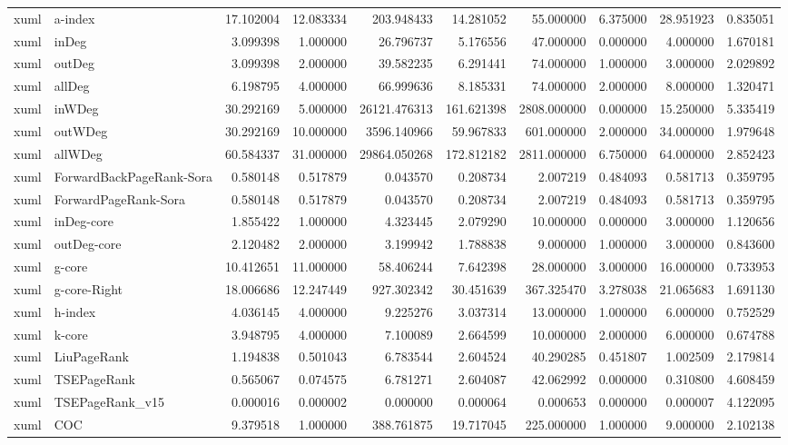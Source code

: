 \begin{tabular}{llrrrrrrrr}
xuml & a-index & 17.102004 & 12.083334 & 203.948433 & 14.281052 & 55.000000 & 6.375000 & 28.951923 & 0.835051 \\
xuml & inDeg & 3.099398 & 1.000000 & 26.796737 & 5.176556 & 47.000000 & 0.000000 & 4.000000 & 1.670181 \\
xuml & outDeg & 3.099398 & 2.000000 & 39.582235 & 6.291441 & 74.000000 & 1.000000 & 3.000000 & 2.029892 \\
xuml & allDeg & 6.198795 & 4.000000 & 66.999636 & 8.185331 & 74.000000 & 2.000000 & 8.000000 & 1.320471 \\
xuml & inWDeg & 30.292169 & 5.000000 & 26121.476313 & 161.621398 & 2808.000000 & 0.000000 & 15.250000 & 5.335419 \\
xuml & outWDeg & 30.292169 & 10.000000 & 3596.140966 & 59.967833 & 601.000000 & 2.000000 & 34.000000 & 1.979648 \\
xuml & allWDeg & 60.584337 & 31.000000 & 29864.050268 & 172.812182 & 2811.000000 & 6.750000 & 64.000000 & 2.852423 \\
xuml & ForwardBackPageRank-Sora & 0.580148 & 0.517879 & 0.043570 & 0.208734 & 2.007219 & 0.484093 & 0.581713 & 0.359795 \\
xuml & ForwardPageRank-Sora & 0.580148 & 0.517879 & 0.043570 & 0.208734 & 2.007219 & 0.484093 & 0.581713 & 0.359795 \\
xuml & inDeg-core & 1.855422 & 1.000000 & 4.323445 & 2.079290 & 10.000000 & 0.000000 & 3.000000 & 1.120656 \\
xuml & outDeg-core & 2.120482 & 2.000000 & 3.199942 & 1.788838 & 9.000000 & 1.000000 & 3.000000 & 0.843600 \\
xuml & g-core & 10.412651 & 11.000000 & 58.406244 & 7.642398 & 28.000000 & 3.000000 & 16.000000 & 0.733953 \\
xuml & g-core-Right & 18.006686 & 12.247449 & 927.302342 & 30.451639 & 367.325470 & 3.278038 & 21.065683 & 1.691130 \\
xuml & h-index & 4.036145 & 4.000000 & 9.225276 & 3.037314 & 13.000000 & 1.000000 & 6.000000 & 0.752529 \\
xuml & k-core & 3.948795 & 4.000000 & 7.100089 & 2.664599 & 10.000000 & 2.000000 & 6.000000 & 0.674788 \\
xuml & LiuPageRank & 1.194838 & 0.501043 & 6.783544 & 2.604524 & 40.290285 & 0.451807 & 1.002509 & 2.179814 \\
xuml & TSEPageRank & 0.565067 & 0.074575 & 6.781271 & 2.604087 & 42.062992 & 0.000000 & 0.310800 & 4.608459 \\
xuml & TSEPageRank_v15 & 0.000016 & 0.000002 & 0.000000 & 0.000064 & 0.000653 & 0.000000 & 0.000007 & 4.122095 \\
xuml & COC & 9.379518 & 1.000000 & 388.761875 & 19.717045 & 225.000000 & 1.000000 & 9.000000 & 2.102138 \\
\bottomrule
\end{tabular}
